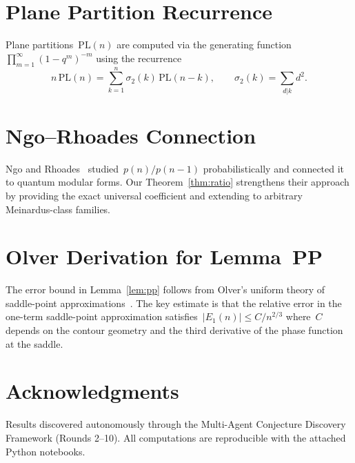 \documentclass[11pt,a4paper]{article}
\begin{document}
\appendix
\section{Plane Partition Recurrence}\label{app:pp_recurrence}

Plane partitions~$\mathrm{PL}(n)$ are computed via the generating function~$\prod_{m=1}^{\infty}(1-q^m)^{-m}$ using the recurrence
\[
  n\,\mathrm{PL}(n) = \sum_{k=1}^{n}\sigma_2(k)\,\mathrm{PL}(n-k),
  \qquad \sigma_2(k) = \sum_{d|k} d^2.
\]

\section{Ngo--Rhoades Connection}\label{app:ngo_rhoades}

Ngo and Rhoades~\cite{ngo2017} studied~$p(n)/p(n-1)$ probabilistically and connected it to quantum modular forms. Our Theorem~\ref{thm:ratio} strengthens their approach by providing the exact universal coefficient and extending to arbitrary Meinardus-class families.

\section{Olver Derivation for Lemma~PP}\label{app:olver}

The error bound in Lemma~\ref{lem:pp} follows from Olver's uniform theory of saddle-point approximations~\cite{olver1974}. The key estimate is that the relative error in the one-term saddle-point approximation satisfies~$|E_1(n)| \leq C/n^{2/3}$ where~$C$ depends on the contour geometry and the third derivative of the phase function at the saddle.

\section*{Acknowledgments}

Results discovered autonomously through the Multi-Agent Conjecture Discovery Framework (Rounds 2--10). All computations are reproducible with the attached Python notebooks.
\end{document}
